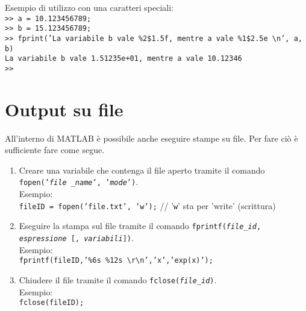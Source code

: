 Esempio di utilizzo con una caratteri speciali: \\
\texttt{>> a = 10.123456789;} \\
\texttt{>> b = 15.123456789;} \\
\texttt{>> fprint('La variabile b vale \%2\$1.5f, mentre a vale \%1\$2.5e \textbackslash n', a, b)} \\
\texttt{La variabile b vale 1.51235e+01, mentre a vale 10.12346} \\
\texttt{>> } \\

\section{Output su file}
All'interno di MATLAB è possibile anche eseguire stampe su file. Per fare ciò è sufficiente fare come segue.
\begin{enumerate}
	\item	Creare una variabile che contenga il file aperto tramite il comando \texttt{fopen('\textit{file
			\_name}', '\textit{mode}')}. \\
			Esempio: \\ \texttt{fileID = fopen('file.txt', 'w');} // '\texttt{w}' sta per 'write' (scrittura)
			
	\item 	Eseguire la stampa sul file tramite il comando \texttt{fprintf(\textit{file\_id}, \textit{espressione} [, 	
	\textit{variabili}])}. \\
			Esempio: \\ \texttt{fprintf(fileID,'\%6s \%12s \textbackslash r\textbackslash n','x','exp(x)');}
			
	\item 	Chiudere il file tramite il comando \texttt{fclose(\textit{file\_id})}. \\
			Esempio: \\ \texttt{fclose(fileID);}
\end{enumerate}